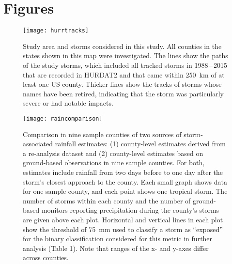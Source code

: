 \section*{Figures}

\listoffigures

\clearpage

\begin{figure}[tbhp!] \centering
\texttt{[image: hurrtracks]}
\caption{Study area and storms considered in this study. All counties in the states
	shown in this map were investigated. The lines show the paths of the
	study storms, which included all tracked storms in 1988\,--\,2015 that
	are recorded in \ac{HURDAT2} and that came
	within 250~\si{\kilo\metre} of at least one \ac{US} county. Thicker
	lines show the tracks of storms whose names have been retired,
	indicating that the storm was particularly severe or had notable
	impacts.  }
\label{fig:hurrtracks}
\end{figure}

\clearpage

\begin{figure}[tbhp!] \centering
\texttt{[image: raincomparison]} 
	\caption{Comparison in nine sample counties of two sources of storm-associated 
	rainfall estimates: (1) county-level estimates derived from 
	a re-analysis dataset and (2) county-level estimates based on ground-based
	observations in nine sample counties. For both, estimates  
	include rainfall from two days before to one day after the storm's closest
	approach to the county. Each small graph shows data for one sample county, 
	and each point shows one tropical storm. The number of storms 
	within each county and the number of ground-based monitors reporting precipitation during 
	the county's storms are given above each plot. Horizontal and vertical lines 
	in each plot show the threshold of 75~\si{\milli\metre} used to classify a storm 
	as ``exposed'' for the binary classification considered for this metric 
	in further analysis (Table 1). Note that 
	ranges of the x- and y-axes differ across counties.
	} 
\label{fig:raincomparison}
\end{figure}

